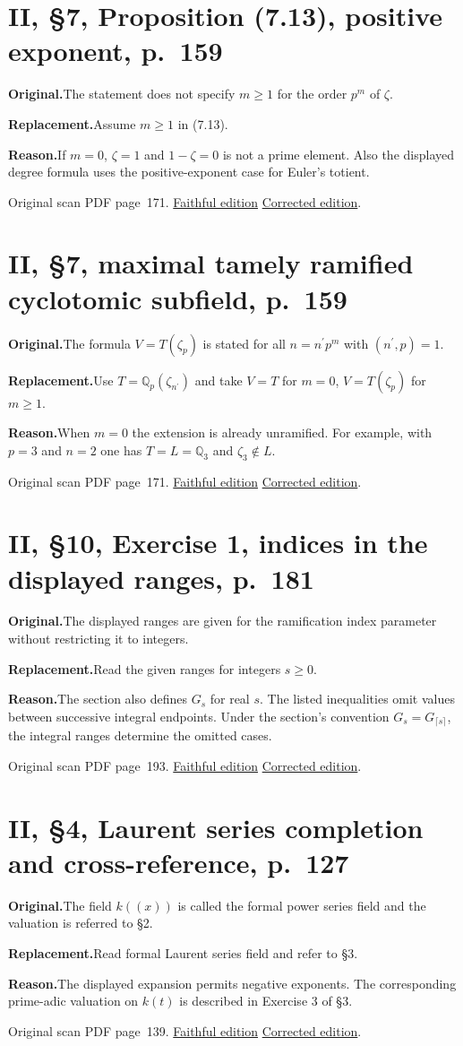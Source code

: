 \documentclass[11pt,a4paper]{article}
\newcommand{\original}{\par\smallskip\noindent\textbf{Original.}\enspace}
\newcommand{\replacement}{\par\smallskip\noindent\textbf{Replacement.}\enspace}
\newcommand{\reason}{\par\smallskip\noindent\textbf{Reason.}\enspace}
\newcommand{\editionlink}[3]{\href{#1\#errata.#2}{#3}}
\newcommand{\location}[2]{%
  \par\smallskip\noindent Original scan PDF page~#2.\enspace
  \editionlink{Neukirch_Faithful.pdf}{#1}{Faithful edition}
  \quad\editionlink{Neukirch_Corrected.pdf}{#1}{Corrected edition}.}
\begin{document}
\setcounter{section}{78}
\section{II, \S7, Proposition (7.13), positive exponent, p.~159}\label{errata:item:79}

\original The statement does not specify $m\ge1$ for the order $p^m$ of $\zeta$.
\replacement Assume $m\ge1$ in (7.13).
\reason If $m=0$, $\zeta=1$ and $1-\zeta=0$ is not a prime element. Also the displayed degree formula uses the positive-exponent case for Euler\textquoteright{}s totient.
\location{79}{171}

\setcounter{section}{79}
\section{II, \S7, maximal tamely ramified cyclotomic subfield, p.~159}\label{errata:item:80}

\original The formula $V=T(\zeta_p)$ is stated for all $n=n^{\prime}p^m$ with $(n^{\prime},p)=1$.
\replacement Use $T=\mathbb Q_p(\zeta_{n^{\prime}})$ and take $V=T$ for $m=0$, $V=T(\zeta_p)$ for $m\ge1$.
\reason When $m=0$ the extension is already unramified. For example, with $p=3$ and $n=2$ one has $T=L=\mathbb Q_3$ and $\zeta_3\notin L$.
\location{80}{171}

\setcounter{section}{80}
\section{II, \S10, Exercise 1, indices in the displayed ranges, p.~181}\label{errata:item:81}

\original The displayed ranges are given for the ramification index parameter without restricting it to integers.
\replacement Read the given ranges for integers $s\ge0$.
\reason The section also defines $G_s$ for real $s$. The listed inequalities omit values between successive integral endpoints. Under the section\textquoteright{}s convention $G_s=G_{\lceil s\rceil}$, the integral ranges determine the omitted cases.
\location{81}{193}

\setcounter{section}{81}
\section{II, \S4, Laurent series completion and cross-reference, p.~127}\label{errata:item:82}

\original The field $k((x))$ is called the formal power series field and the valuation is referred to \S2.
\replacement Read formal Laurent series field and refer to \S3.
\reason The displayed expansion permits negative exponents. The corresponding prime-adic valuation on $k(t)$ is described in Exercise 3 of \S3.
\location{82}{139}
\end{document}
